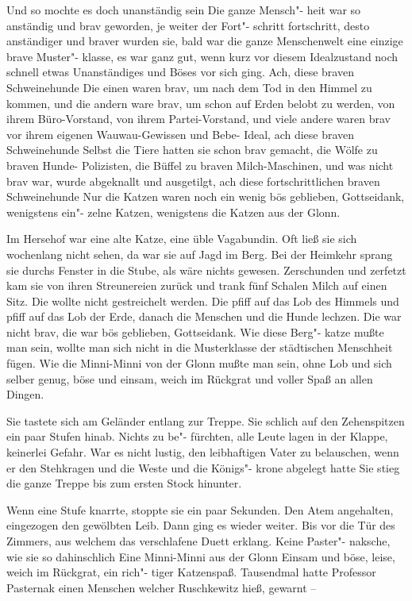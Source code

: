 Und so mochte es doch unanständig sein\ausr{} Die ganze Mensch"-%
heit war so anständig und brav geworden, je weiter der Fort"-%
schritt fortschritt, desto anständiger und braver wurden sie,
bald war die ganze Menschenwelt eine einzige brave Muster"-%
klasse, es war ganz gut, wenn kurz vor diesem Idealzustand
noch schnell etwas Unanständiges und Böses vor sich ging.
Ach, diese braven Schweinehunde\ausr{} Die einen waren brav,
um nach dem Tod in den Himmel zu kommen, und die andern
ware brav, um schon auf Erden belobt zu werden, von ihrem
Büro-Vorstand, von ihrem Partei-Vorstand, und viele andere
waren brav vor ihrem eigenen Wauwau-Gewissen und Bebe\label{lS88-1}-%
Ideal, ach diese braven Schweinehunde\ausr{} Selbst die Tiere
hatten sie schon brav gemacht, die Wölfe zu braven Hunde-%
Polizisten, die Büffel zu braven Milch-Maschinen, und was
nicht brav war, wurde abgeknallt und ausgetilgt, ach diese
fortschrittlichen braven Schweinehunde\ausr{} Nur die Katzen waren
noch ein wenig bös geblieben, Gottseidank, wenigstens ein"-%
zelne Katzen, wenigstens die Katzen aus der Glonn.

Im Hersehof war eine alte Katze, eine üble Vagabundin.
Oft ließ sie sich wochenlang nicht sehen, da war sie auf Jagd
im Berg. Bei der Heimkehr sprang sie durchs Fenster in die
Stube, als wäre nichts gewesen. Zerschunden und zerfetzt
kam sie von ihren Streunereien zurück und trank fünf Schalen
Milch auf einen Sitz. Die wollte nicht gestreichelt werden.
Die pfiff auf das Lob des Himmels und pfiff auf das Lob der
Erde, danach die Menschen und die Hunde lechzen. Die war
nicht brav, die war bös geblieben, Gottseidank. Wie diese Berg"-%
katze mußte man sein, wollte man sich nicht in die Musterklasse
der städtischen Menschheit fügen. Wie die Minni-Minni von
der Glonn mußte man sein, ohne Lob und sich selber genug,
böse und einsam, weich im Rückgrat und voller Spaß an
allen Dingen.

Sie tastete sich am Geländer entlang zur Treppe. Sie schlich
auf den Zehenspitzen ein paar Stufen hinab. Nichts zu be"-%
fürchten, alle Leute lagen in der Klappe, keinerlei Gefahr.
War es nicht lustig, den leibhaftigen Vater zu belauschen,
wenn er den Stehkragen und die Weste und die Königs"-%
krone abgelegt hatte\frag{} Sie stieg die ganze Treppe bis zum
ersten Stock hinunter.

Wenn eine Stufe knarrte, stoppte sie ein paar Sekunden.
Den Atem angehalten, eingezogen den gewölbten Leib.
Dann ging es wieder weiter. Bis vor die Tür des Zimmers,
aus welchem das verschlafene Duett erklang. Keine Paster"-%
naksche, wie sie so dahinschlich\ausr{} Eine Minni-Minni aus der
Glonn\ausr{} Einsam und böse, leise, weich im Rückgrat, ein rich"-%
tiger Katzenspaß.
\abstand{}
Tausendmal hatte Professor Pasternak einen Menschen
welcher Ruschkewitz hieß, gewarnt --

